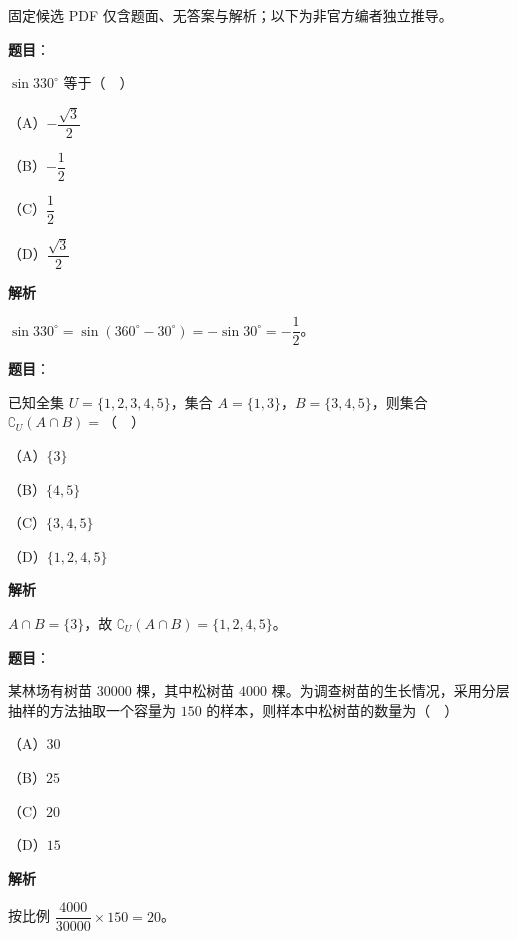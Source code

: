 

\begin{gktip}
固定候选 PDF 仅含题面、无答案与解析；以下为非官方编者独立推导。
\end{gktip}

\begin{answer}

\textbf{题目}：

$\sin330^\circ$ 等于（　）

（A）$-\dfrac{\sqrt3}2$

（B）$-\dfrac12$

（C）$\dfrac12$

（D）$\dfrac{\sqrt3}2$

\textbf{解析}

$\sin330^\circ=\sin(360^\circ-30^\circ)=-\sin30^\circ=-\dfrac12$。


\end{answer}
\begin{answer}

\textbf{题目}：

已知全集 $U=\{1,2,3,4,5\}$，集合 $A=\{1,3\}$，$B=\{3,4,5\}$，则集合 $\complement_U(A\cap B)=$（　）

（A）$\{3\}$

（B）$\{4,5\}$

（C）$\{3,4,5\}$

（D）$\{1,2,4,5\}$

\textbf{解析}

$A\cap B=\{3\}$，故 $\complement_U(A\cap B)=\{1,2,4,5\}$。


\end{answer}
\begin{answer}

\textbf{题目}：

某林场有树苗 $30000$ 棵，其中松树苗 $4000$ 棵。为调查树苗的生长情况，采用分层抽样的方法抽取一个容量为 $150$ 的样本，则样本中松树苗的数量为（　）

（A）$30$

（B）$25$

（C）$20$

（D）$15$

\textbf{解析}

按比例 $\dfrac{4000}{30000}\times150=20$。


\end{answer}
